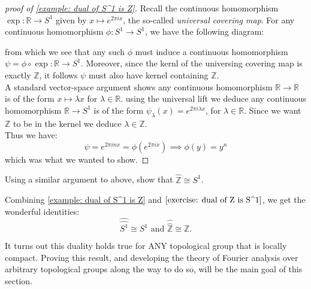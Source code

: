 \documentclass[11pt, x11names]{book}
\newcommand{\zz}{\mathbb{Z}}
\newcommand{\rr}{\mathbb{R}}
\renewcommand{\hat}{\widehat}
\begin{document}
\begin{proof}[proof of \ref{example: dual of S^1 is Z}]
Recall the continuous homomorphism $\exp: \rr \to S^1$ given by $x \mapsto e^{2 \pi i x}$, the so-called \textit{universal covering map}. For any continuous homomorphism $\phi: S^1 \to S^1$, we have the following diagram:
\begin{center}
\end{center} 
from which we see that any such $\phi$ must induce a continuous homomorphism $\psi = \phi \circ \exp: \rr \to S^1$. Moreover, since the kernl of the universing covering map is exactly $\zz$, it follows $\psi$ must also have kernel containing $\zz$. \\
A standard vector-space argument shows any continuous homomorphism  $\rr \to \rr$ is of the form $x \mapsto \lambda x$ for $\lambda \in \rr$. using the universal lift we deduce any continuous homomorphism $\rr \to S^1$ is of the form $\psi_\lambda(x) = e^{2 \pi i \lambda x}$, for $\lambda \in \rr$. Since we want $\zz$ to be in the kernel we deduce $\lambda \in \zz$.\\
Thus we have:
\begin{equation*}
    \psi = e^{2 \pi i n x} = \phi (e^{2 \pi i x}) \implies \phi(y) = y^n
\end{equation*}
which was what we wanted to show.
\end{proof}
 
\begin{exercise}
\label{exercise: dual of Z is S^1}
    Using a similar argument to above, show that $\hat{\zz} \cong S^1$.
\end{exercise}

Combining \ref{example: dual of S^1 is Z} and $\ref{exercise: dual of Z is S^1}$, we get the wonderful identities:
\begin{equation*}
    \hat{\hat{S^1}} \cong S^1 \text{ and } \hat{\hat{\zz}} \cong \zz.
\end{equation*}
 
It turns out this duality holds true for ANY topological group that is locally compact. Proving this result, and developing the theory of Fourier analysis over arbitrary topological groups along the way to do so, will be the main goal of this section.
\end{document}
